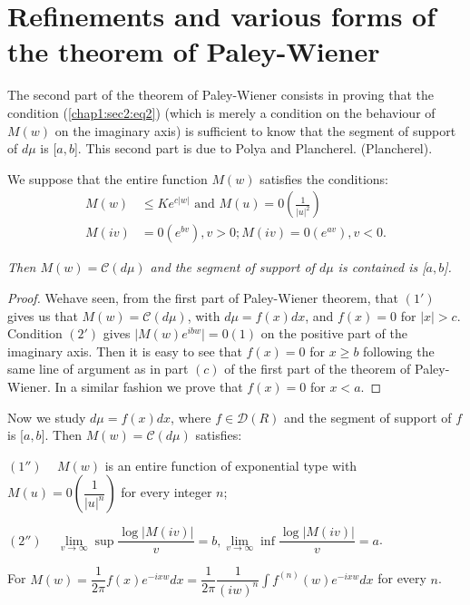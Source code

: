 \section[Refinements and various forms of...]{Refinements and various forms of the theorem of
  Paley-Wiener}\label{chap3:sec2}%
 
 The second part of the theorem of Paley-Wiener consists in proving
 that the condition (\ref{chap1:sec2:eq2}) (which is merely a condition on the
 behaviour of $M(w)$ on the imaginary axis) is sufficient to know that
 the segment of support of $d \mu $ is [$a, b$]. This second part is
 due to Polya and Plancherel. (Plancherel). 
 \begin{theorem*}
 We suppose that the entire function $M (w) $ satisfies the conditions:
 \begin{align*}
  M(w) &\leq K e^{c|w|} \text{ and } M(u) = 0
  \left(\frac{1}{|u|^2}\right) \tag{$1'$}\\ 
  M(iv) &= 0(e^{bv}), v > 0; M(iv) = 0(e^{av}), v < 0. \tag{$2'$}
 \end{align*} 
 \end{theorem*}

\textit{Then $M(w) = \mathscr{C}(d \mu)$ and the segment of support of
 $d \mu$ is contained is [$a, b$].} 

\begin{proof}
 We\pageoriginale have seen, from the first part of Paley-Wiener theorem, that
 $(1')$ gives us that $M(w) = \mathscr{C} (d \mu)$, with $d \mu =
 f(x) dx$, and $f(x) = 0$ for $|x| >c$. Condition $(2')$ gives
 $\Big|M(w) e^{ibw}\Big| = 0(1)$ on the positive part of the
 imaginary axis. Then it is easy to see that $f(x) = 0$ for $x \geq
 b$ following the same line of argument as in part $(c)$ of the first
 part of the theorem of Paley-Wiener. In a similar fashion we prove
 that $f(x) = 0$ for $x < a$. 
\end{proof}

Now we study $d \mu = f(x) dx$, where $f \in \mathscr{D}(R)$ and the
segment of support of $f$ is [$a, b$]. Then $ M(w) = \mathscr{C} (d
\mu)$ satisfies: 

$(1'')$ ~ $M(w)$ is an entire function of exponential type with $M (u)
= 0 (\dfrac{1}{|u|^n})$ for every integer $n$; 

$(2'')$ ~ $\lim\limits_{v \to \infty} \sup \dfrac{\log |M(iv)|}{v}= b
,\lim\limits_{v \to \infty} \inf \dfrac{\log |M(iv)|}{v} = a$. 

For $M(w) = \dfrac{1}{2 \pi} f (x) e^{-ixw} dx = \dfrac{1}{2
 \pi}\dfrac{1}{(iw)^n} \int f^{(n)}(w)e^{-ixw} dx$ for every $n$. 

